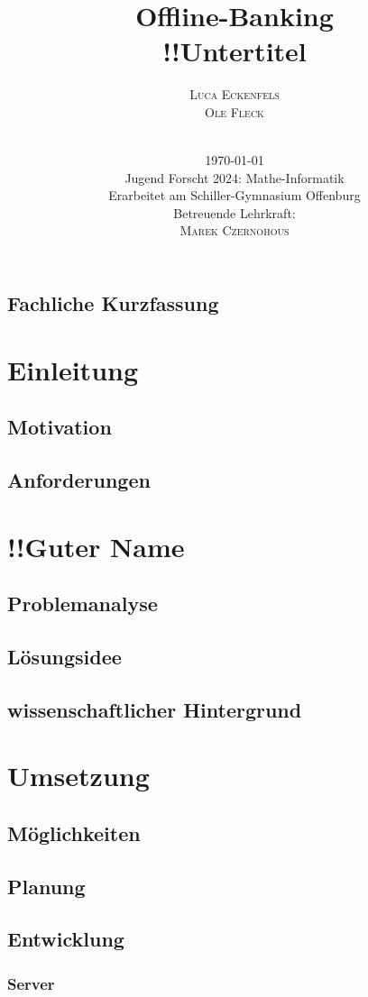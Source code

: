 \documentclass[a4paper,12pt,ngerman]{scrreport}
\title{Offline-Banking\\
    \vspace{6mm}
    \large{!!Untertitel}}
\author{\Large{\textsc{Luca Eckenfels}}\\\textsc{Ole Fleck}\\
    \vspace{5cm}\\
\date{\today\\\vspace{12mm}
Jugend Forscht 2024: Mathe-Informatik\\\vspace{6mm}
    Erarbeitet am Schiller-Gymnasium Offenburg\\
Betreuende Lehrkraft: \\\textsc{Marek Czernohous}}
}
\begin{document}
    \maketitle
    \tableofcontents
    \newpage
    \section*{Fachliche Kurzfassung}
    \chapter{Einleitung}\label{ch:einleitung}
    \section{Motivation}
    \section{Anforderungen}

    \chapter{!!Guter Name}
    \section{Problemanalyse}
    \section{Lösungsidee}
    \section{wissenschaftlicher Hintergrund}

    \chapter{Umsetzung}\label{ch:umsetzung}
    \section{Möglichkeiten}
    \section{Planung}
    \section{Entwicklung}
    \subsection{Server}
\end{document}
